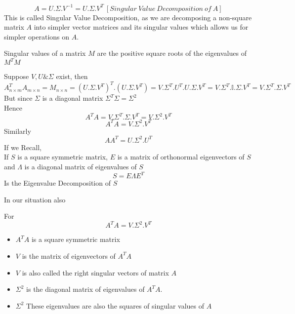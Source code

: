 \documentclass{article}
\begin{document}
$$
  A=U.\Sigma.V^{-1}=U.\Sigma.V^{T} \ [Singular\ Value\ Decomposition\ of\ A]
$$
This is called Singular Value Decomposition, as we are decomposing a non-square matrix $A$ into simpler vector matrices and its singular values which allows us for simpler operations on $A$.\\
\begin{tcolorbox}[colback=blue!5!white,colframe=blue!75!black,title=Singular Values]
	Singular values of a matrix $M$ are the positive square roots of the eigenvalues of $M^TM$
  \end{tcolorbox}
Suppose $V,U \& \Sigma$ exist, then\\
$$
  A_{n \times m}^{T}A_{m \times n}=M_{n \times n}=(U.\Sigma.V^{T})^T.(U.\Sigma.V^{T})=V.\Sigma^{T}.U^T.U.\Sigma.V^{T}=V.\Sigma^{T}.\mathbb{I}.\Sigma.V^{T}=V.\Sigma^{T}.\Sigma.V^{T}
$$
But since $\Sigma$ is a diagonal matrix $\Sigma^T\Sigma=\Sigma^2$\\
Hence
$$
  A^{T}A=V.\Sigma^{T}.\Sigma.V^{T}=V.\Sigma^{2}.V^{T}
$$
$$
  A^{T}A=V.\Sigma^{2}.V^{T}
$$
Similarly
$$
  AA^{T}=U.\Sigma^{2}.U^{T}
$$
If we Recall,\\
If $S$ is a square symmetric matrix, $E$ is a matrix of orthonormal eigenvectors of $S$ and $\Lambda$ is a diagonal matrix of eigenvalues of $S$\\
$$
  S=E\Lambda E^T
$$
Is the Eigenvalue Decomposition of $S$\pagebreak

In our situation also\\

\begin{tcolorbox}[colback=blue!5!white,colframe=blue!75!black,title=Singular Value Decomposition $\Longleftrightarrow $ Eigenvalue Decomposition]
	For 
	$$
	  A^{T}A=V.\Sigma^{2}.V^{T}
	$$
	
	\begin{itemize}
		\item $A^{T}A$ is a square symmetric matrix
		\item $V$ is the matrix of eigenvectors of $A^{T}A$
		\item $V$ is also called the right singular vectors of matrix $A$
		\item $\Sigma^{2}$ is the diagonal matrix of eigenvalues of $A^{T}A$. 
		\item $\Sigma^{2}$ These eigenvalues are also the squares of singular values of $A$
	\end{itemize}
  \end{tcolorbox}
\end{document}
